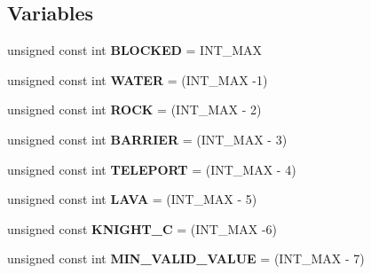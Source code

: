 \subsection*{\-Variables}
\begin{DoxyCompactItemize}
\item 
\hypertarget{namespaceknight__t_abd3220046fe7d32c33bd06fd40649446}{unsigned const int {\bfseries \-B\-L\-O\-C\-K\-E\-D} = \-I\-N\-T\-\_\-\-M\-A\-X}\label{namespaceknight__t_abd3220046fe7d32c33bd06fd40649446}

\item 
\hypertarget{namespaceknight__t_a388904b19187fbf7ba889ee7660f8777}{unsigned const int {\bfseries \-W\-A\-T\-E\-R} = (\-I\-N\-T\-\_\-\-M\-A\-X -\/1)}\label{namespaceknight__t_a388904b19187fbf7ba889ee7660f8777}

\item 
\hypertarget{namespaceknight__t_a154abc4b2a093067d3868854e48d45b5}{unsigned const int {\bfseries \-R\-O\-C\-K} = (\-I\-N\-T\-\_\-\-M\-A\-X -\/ 2)}\label{namespaceknight__t_a154abc4b2a093067d3868854e48d45b5}

\item 
\hypertarget{namespaceknight__t_af7025e563c61bac968161d3d1b85bb61}{unsigned const int {\bfseries \-B\-A\-R\-R\-I\-E\-R} = (\-I\-N\-T\-\_\-\-M\-A\-X -\/ 3)}\label{namespaceknight__t_af7025e563c61bac968161d3d1b85bb61}

\item 
\hypertarget{namespaceknight__t_addd396a8bf49cd0576d85d5a32e5a42e}{unsigned const int {\bfseries \-T\-E\-L\-E\-P\-O\-R\-T} = (\-I\-N\-T\-\_\-\-M\-A\-X -\/ 4)}\label{namespaceknight__t_addd396a8bf49cd0576d85d5a32e5a42e}

\item 
\hypertarget{namespaceknight__t_a5c10121dac16797c931c6a020baa0d48}{unsigned const int {\bfseries \-L\-A\-V\-A} = (\-I\-N\-T\-\_\-\-M\-A\-X -\/ 5)}\label{namespaceknight__t_a5c10121dac16797c931c6a020baa0d48}

\item 
\hypertarget{namespaceknight__t_a7660a2e3572f1cd4785c7cfd763b4c82}{unsigned const {\bfseries \-K\-N\-I\-G\-H\-T\-\_\-\-C} = (\-I\-N\-T\-\_\-\-M\-A\-X -\/6)}\label{namespaceknight__t_a7660a2e3572f1cd4785c7cfd763b4c82}

\item 
\hypertarget{namespaceknight__t_a02b1ddf0cf4b297b58f97d5423eba09f}{unsigned const int {\bfseries \-M\-I\-N\-\_\-\-V\-A\-L\-I\-D\-\_\-\-V\-A\-L\-U\-E} = (\-I\-N\-T\-\_\-\-M\-A\-X -\/ 7)}\label{namespaceknight__t_a02b1ddf0cf4b297b58f97d5423eba09f}

\end{DoxyCompactItemize}



